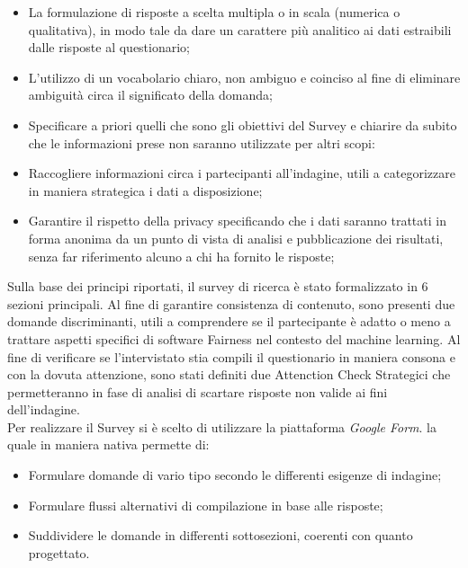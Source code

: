     \begin{itemize}
        \item La formulazione di risposte a scelta multipla o in scala (numerica o qualitativa), in modo tale da dare un carattere più analitico ai dati estraibili dalle risposte al questionario;
        \item L'utilizzo di un vocabolario chiaro, non ambiguo e coinciso al fine di eliminare ambiguità circa il significato della domanda;
        \item Specificare a priori quelli che sono gli obiettivi del Survey e chiarire da subito che le informazioni prese non saranno utilizzate per altri scopi:
        \item Raccogliere informazioni circa i partecipanti all'indagine, utili a categorizzare in maniera strategica i dati a disposizione;
        \item Garantire il rispetto della privacy specificando che i dati saranno trattati in forma anonima da un punto di vista di analisi e pubblicazione dei risultati, senza far riferimento alcuno a chi ha fornito le risposte;
    \end{itemize}
    
    Sulla base dei principi riportati, il survey di ricerca è stato formalizzato in 6 sezioni principali. Al fine di garantire consistenza di contenuto, sono presenti due domande discriminanti, utili a comprendere se il partecipante è adatto o meno a trattare aspetti specifici di software Fairness nel contesto del machine learning. Al fine di verificare se l'intervistato stia compili il questionario in maniera consona e con la dovuta attenzione, sono stati definiti due Attenction Check Strategici che permetteranno in fase di analisi di scartare risposte non valide ai fini dell'indagine.\\ 
    
    Per realizzare il Survey si è scelto di utilizzare la piattaforma \emph{Google Form}. la quale in maniera nativa permette di:
    \
    \begin{itemize}
        \item Formulare domande di vario tipo secondo le differenti esigenze di indagine;
        \item Formulare flussi alternativi di compilazione in base alle risposte;
        \item Suddividere le domande in differenti sottosezioni, coerenti con quanto progettato.
    \end{itemize}
    
